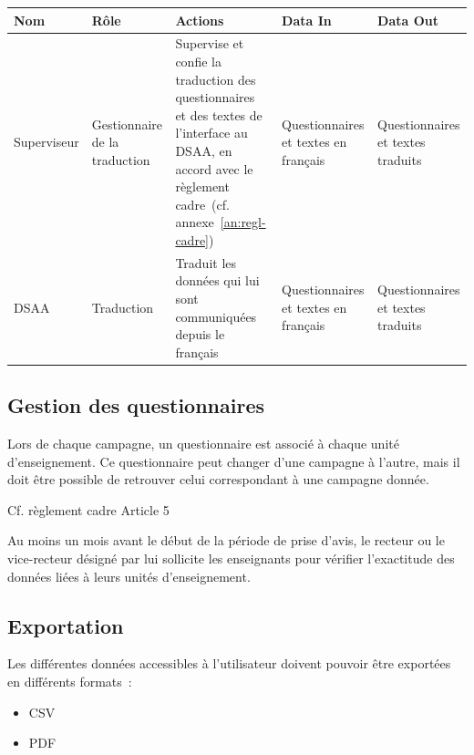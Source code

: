 \documentclass[a4paper,11pt]{report}
\begin{document}
\begin{tabularx}{\linewidth}{|X|X|X|X|X|} \hline
Nom & Rôle & Actions & Data In & Data Out \\ \hline 
Superviseur & Gestionnaire de la traduction & Supervise et confie la traduction des questionnaires et des textes de l'interface au DSAA, en accord avec le règlement cadre~(cf. annexe~\ref{an:regl-cadre}) & Questionnaires et textes en français & Questionnaires et textes traduits \\ 
DSAA & Traduction & Traduit les données qui lui sont communiquées depuis le français & Questionnaires et textes en français & Questionnaires et textes traduits \\ \hline
\end{tabularx}






\subsection{Gestion des questionnaires}
Lors de chaque campagne, un questionnaire est associé à chaque unité d'enseignement.
Ce questionnaire peut changer d'une campagne à l'autre, mais il doit être possible de retrouver celui correspondant à une campagne donnée.

Cf. règlement cadre Article 5

Au moins un mois avant le début de la période de prise d'avis, le recteur ou le vice-recteur désigné par lui sollicite les enseignants pour vérifier l'exactitude des données liées à leurs unités d'enseignement.







\subsection{Exportation}
Les différentes données accessibles à l'utilisateur doivent pouvoir être exportées en différents formats~:
\begin{itemize}
	\item CSV
	\item PDF
\end{itemize}
\end{document}
